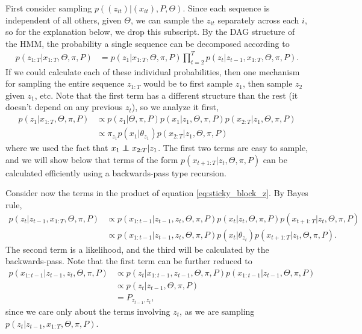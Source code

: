 First consider sampling $p\left(\left(z_{it}\right) \vert \left(x_{it}\right),
P, \Theta\right)$. Since each sequence is independent of all others, given
$\Theta$, we can sample the $z_{it}$ separately across each $i$, so for the
explanation below, we drop this subscript. By the DAG structure of the HMM, the
probability a single sequence can be decomposed according to
\begin{align}
  \label{eq:sticky_block_z}
  p\left(z_{1:T} \vert x_{1:T}, \Theta, \pi, P\right) &= p\left(z_{1} \vert x_{1:T}, \Theta, \pi, P\right) \prod_{t = 2}^{T} p\left(z_{t} \vert z_{t - 1}, x_{1:T}, \Theta, \pi, P\right).
\end{align}
If we could calculate each of these individual probabilities, then one mechanism
for sampling the entire sequence $z_{1:T}$ would be to first sample $z_{1}$,
then sample $z_{2}$ given $z_{1}$, etc. Note that the first term has a different
structure than the rest (it doesn't depend on any previous $z_{t}$), so we
analyze it first,
\begin{align*}
  p\left(z_{1} \vert x_{1:T}, \Theta, \pi, P\right) &\propto p\left(z_{1} \vert \Theta, \pi, P\right) p\left(x_{1} \vert z_{1}, \Theta, \pi, P\right) p\left(x_{2:T} \vert z_{1}, \Theta, \pi, P\right) \\
  &\propto \pi_{z_{1}} p\left(x_{1} \vert \theta_{z_{1}}\right) p\left(x_{2:T} \vert z_{1}, \Theta, \pi, P\right)
\end{align*}
where we used the fact that $x_{1} \independent x_{2:T} \vert z_{1}$. The first
two terms are easy to sample, and we will show below that terms of the form
$p\left(x_{t + 1:T} \vert z_{t}, \Theta, \pi, P\right)$ can be calculated
efficiently using a backwards-pass type recursion.

Consider now the terms in the product of equation \ref{eq:sticky_block_z}. By
Bayes rule,
\begin{align*}
  p\left(z_{t} \vert z_{t - 1}, x_{1:T}, \Theta, \pi, P\right) &\propto p\left(x_{1:t - 1} \vert z_{t - 1}, z_{t}, \Theta, \pi, P\right)
  p\left(x_{t} \vert z_{t}, \Theta, \pi, P\right)
  p\left(x_{t + 1 : T} \vert z_{t}, \Theta, \pi, P\right) \\
  &\propto p\left(x_{1:t - 1} \vert z_{t - 1}, z_t, \Theta, \pi, P\right) p\left(x_t \vert \theta_{z_t}\right) p\left(x_{t + 1 : T}\vert z_{t}, \Theta, \pi, P\right).
\end{align*}
The second term is a likelihood, and the third will be calculated by the
backwards-pass. Note that the first term can be further reduced to
\begin{align*}
  p\left(x_{1:t - 1} \vert z_{t - 1}, z_t, \Theta, \pi, P\right) &\propto p\left(z_{t} \vert x_{1:t - 1}, z_{t - 1}, \Theta, \pi, P\right)p\left(x_{1:t - 1} \vert z_{t - 1}, \Theta, \pi, P\right) \\
  &\propto p\left(z_{t} \vert z_{t - 1}, \Theta, \pi, P\right) \\
  &= P_{z_{t - 1}, z_{t}},
\end{align*}
since we care only about the terms involving $z_{t}$, as we are sampling
$p\left(z_{t} \vert z_{t - 1}, x_{1:T}, \Theta, \pi, P\right)$.


